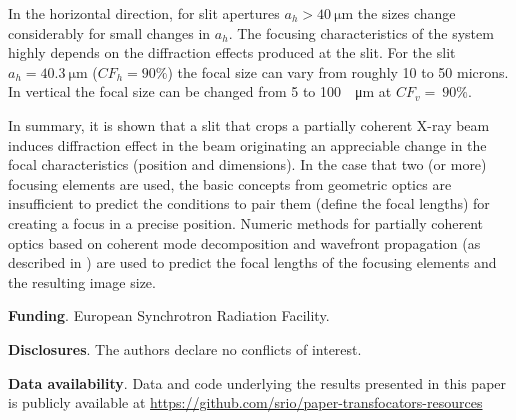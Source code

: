 \documentclass[9pt,twocolumn,twoside]{osajnl}
\begin{document}
In the horizontal direction, for slit apertures $a_h>\SI{40}{\micro\meter}$ the sizes change considerably for small changes in $a_h$. The focusing characteristics of the system highly depends on the diffraction effects produced at the slit. For the slit $a_h=\SI{40.3}{\micro\meter}$ ($CF_h=90\%$) the focal size can vary from roughly 10 to 50 microns.  In vertical the focal size can be changed from 5 to 100~\SI{}{\micro\meter} at $CF_v=~90\%$.

In summary, it is shown that a slit that crops a partially coherent X-ray beam induces diffraction effect in the beam originating an appreciable change in the focal characteristics (position and dimensions). In the case that two (or more) focusing elements are used, the basic concepts from geometric optics are insufficient to predict the conditions to pair them (define the focal lengths) for creating a focus in a precise position. Numeric methods for partially coherent optics based on coherent mode decomposition and wavefront propagation (as described in \cite{delrio2021pairing}) are used to predict the focal lengths of the focusing elements and the resulting image size.   



\textbf{Funding}. European Synchrotron Radiation Facility.


\textbf{Disclosures}. The authors declare no conflicts of interest.

\textbf{Data availability}. Data and code underlying the results presented in this paper is publicly available at \url{https://github.com/srio/paper-transfocators-resources}




\end{document}
